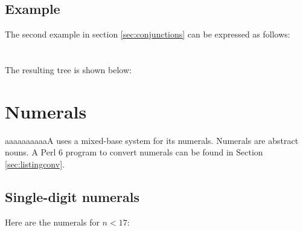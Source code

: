 \documentclass{book}
\newcommand{\lname}{aaaaaaaaaaA}
\begin{document}
\section{Example}

The second example in section \ref{sec:conjunctions} can be expressed as follows: \\
~\\
 \\

The resulting tree is shown below:

\begin{center}
\end{center}

\chapter{Numerals}

\lname{} uses a mixed-base system for its numerals. Numerals are abstract nouns. A Perl 6 program to convert numerals can be found in Section \ref{sec:listingconv}.

\section{Single-digit numerals}

Here are the numerals for $n < 17$:
\end{document}
